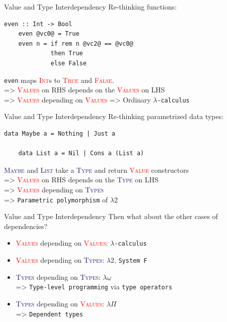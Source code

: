 \documentclass[xcolor={usenames,dvipsnames}]{beamer}
\newcommand{\htycon}[1]{\textcolor{MidnightBlue}{\textsc{#1}}}
\newcommand{\hvalcon}[1]{\textcolor{Red}{\textsc{#1}}}
\begin{document}
\begin{frame}[fragile]{Value and Type Interdependency}
  Re-thinking functions:
  \begin{lstlisting}[style=hask]
    even :: Int -> Bool
    even @vc0@ = True
    even n = if rem n @vc2@ == @vc0@
             then True
             else False
  \end{lstlisting}

  \qquad \texttt{even} maps \hvalcon{Int}s to \hvalcon{True} and \hvalcon{False}.
  \ \\
  => \hvalcon{Values} on RHS depends on the \hvalcon{Values} on LHS
  \ \\
  => \hvalcon{Values} depending on \hvalcon{Values}
  => Ordinary \texttt{$\lambda$-calculus}
\end{frame}

\begin{frame}[fragile]{Value and Type Interdependency}
  Re-thinking parametrized data types:
  \begin{lstlisting}[style=hask]
    data Maybe a = Nothing | Just a

    data List a = Nil | Cons a (List a)
  \end{lstlisting}

  \qquad \htycon{Maybe} and \htycon{List} take a \htycon{Type} and return \hvalcon{Value} constructors
  \ \\
  => \hvalcon{Values} on RHS depends on the \htycon{Type} on LHS
  \ \\
  => \hvalcon{Values} depending on \htycon{Types}
  \ \\
  => \texttt{Parametric polymorphism} of $\lambda2$

\end{frame}

\begin{frame}[fragile]{Value and Type Interdependency}
  Then what about the other cases of dependencies?
  \begin{itemize}
    \item \hvalcon{Values} depending on \hvalcon{Values}: \texttt{$\lambda$-calculus}
    \item \hvalcon{Values} depending on \htycon{Types}: $\lambda2$, \texttt{System F}
    \pause
    \item \htycon{Types} depending on \htycon{Types}: $\lambda\underline\omega$\\
      => \texttt{Type-level programming} via \texttt{type operators}
    \pause
    \item \htycon{Types} depending on \hvalcon{Values}: $\lambda\Pi$\\
      => \texttt{Dependent types}
  \end{itemize}
\end{frame}
\end{document}
